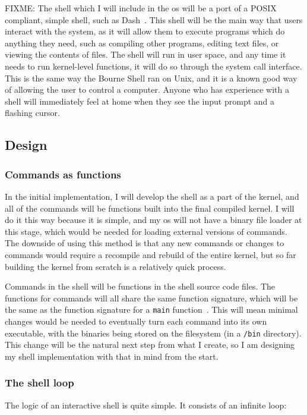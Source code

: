 \documentclass{article}
\begin{document}
FIXME:
The shell which I will include in the \gls{os} will be a port of a POSIX
compliant, simple shell, such as Dash~\cite{dash-shell}. This shell will be the
main way that users interact with the system, as it will allow them to execute
programs which do anything they need, such as compiling other programs, editing
text files, or viewing the contents of files. The shell will run in user space,
and any time it needs to run kernel-level functions, it will do so through the
system call interface. This is the same way the Bourne Shell ran on Unix, and
it is a known good way of allowing the user to control a computer. Anyone who
has experience with a shell will immediately feel at home when they see the
input prompt and a flashing cursor.

\subsection{Design}

\subsubsection{Commands as functions}
In the initial implementation, I will develop the shell as a part of the
kernel, and all of the commands will be functions built into the final compiled
kernel. I will do it this way because it is simple, and my \gls{os} will not
have a binary file loader at this stage, which would be needed for loading
external versions of commands. The downside of using this method is that any
new commands or changes to commands would require a recompile and rebuild of
the entire kernel, but so far building the kernel from scratch is a relatively
quick process.

Commands in the shell will be functions in the shell source code files. The
functions for commands will all share the same function signature, which will
be the same as the function signature for a \texttt{main}
function~\cite{c-main-func}. This will mean minimal changes would be needed to
eventually turn each command into its own executable, with the binaries being
stored on the filesystem (in a \texttt{/bin} directory). This change will be
the natural next step from what I create, so I am designing my shell
implementation with that in mind from the start.

\subsubsection{The shell loop}
The logic of an interactive shell is quite simple. It consists of an infinite
loop:
\end{document}
